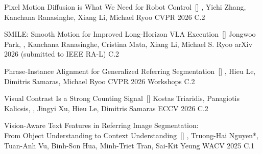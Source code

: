 
\begin{publications}
\publication
    {Pixel Motion Diffusion is What We Need for Robot Control}{~[\href{https://eronguyen.me/DAWN}{\small{\linkSymbol}}]}
    {\underline{}, Yichi Zhang, Kanchana Ranasinghe,  Xiang Li, Michael Ryoo}
    {CVPR 2026} {} {C.2}

\publication
    {SMILE: Smooth Motion for Improved Long-Horizon VLA Execution}{~[\href{https://arxiv.org/abs/2608.29432}{\small{\linkSymbol}}]}
    {Jongwoo Park, \underline{}, Kanchana Ranasinghe, Cristina Mata, Xiang Li, Michael S. Ryoo}
    {arXiv 2026 (submitted to IEEE RA-L)} {} {C.2}

\publication
    {Phrase-Instance Alignment for Generalized Referring Segmentation}{~[\href{https://eronguyen.me/InstAlign/}{\small{\linkSymbol}}]}
    {\underline{}, Hieu Le, Dimitris Samaras, Michael Ryoo}
    {CVPR 2026 Workshops} {} {C.2}

\publication
    {Visual Contrast Is a Strong Counting Signal}{~[\href{https://arxiv.org/abs/2505.22850}{\small{\linkSymbol}}]}
    {Kostas Triaridis, Panagiotis Kaliosis, \underline{}, Jingyi Xu, Hieu Le, Dimitris Samaras}
    {ECCV 2026} {} {C.2}


\publication
    {Vision-Aware Text Features in Referring Image Segmentation:  \\ From Object Understanding to Context Understanding}{~[\href{https://vatex.hkustvgd.com/}{\small{\linkSymbol}}]}
    {\underline{}, Truong-Hai Nguyen*, Tuan-Anh Vu, Binh-Son Hua, Minh-Triet Tran, Sai-Kit Yeung}
	{WACV 2025} {}  {C.1}
	
	 	
\end{publications}
\vspace{-10mm}
